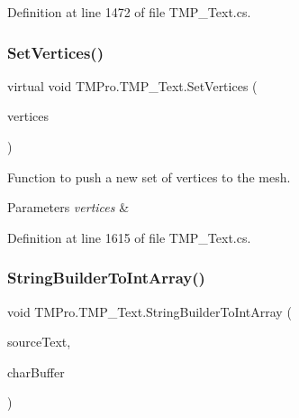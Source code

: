 Definition at line 1472 of file T\+M\+P\+\_\+\+Text.\+cs.

\mbox{\label{class_t_m_pro_1_1_t_m_p___text_a4b55ef60875f30db737601cf3c14d551}} 
\subsubsection{\texorpdfstring{SetVertices()}{SetVertices()}}
{\footnotesize\ttfamily virtual void T\+M\+Pro.\+T\+M\+P\+\_\+\+Text.\+Set\+Vertices (\begin{DoxyParamCaption}\item[{Vector3 \mbox{[}$\,$\mbox{]}}]{vertices }\end{DoxyParamCaption})\hspace{0.3cm}{\ttfamily [virtual]}}



Function to push a new set of vertices to the mesh. 


\begin{DoxyParams}{Parameters}
{\em vertices} & \\
\hline
\end{DoxyParams}


Definition at line 1615 of file T\+M\+P\+\_\+\+Text.\+cs.

\mbox{\label{class_t_m_pro_1_1_t_m_p___text_a8924da6e6d1cecb3b8c542d3ad9d92cd}} 
\subsubsection{\texorpdfstring{StringBuilderToIntArray()}{StringBuilderToIntArray()}}
{\footnotesize\ttfamily void T\+M\+Pro.\+T\+M\+P\+\_\+\+Text.\+String\+Builder\+To\+Int\+Array (\begin{DoxyParamCaption}\item[{String\+Builder}]{source\+Text,  }\item[{ref int \mbox{[}$\,$\mbox{]}}]{char\+Buffer }\end{DoxyParamCaption})\hspace{0.3cm}{\ttfamily [protected]}}



